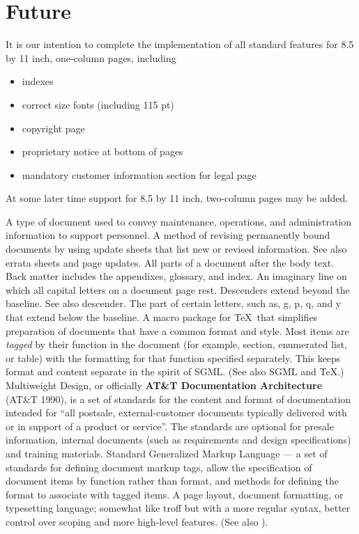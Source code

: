 \section{Future}
It is our intention to complete the implementation of all standard
features for 8.5 by 11 inch, one-column pages, including
\begin{itemize}
  \item indexes
  \item correct size fonts (including 115 pt)
  \item copyright page
  \item proprietary notice at bottom of pages
  \item mandatory customer information section for legal page
\end{itemize}

At some later time support for 8.5 by 11 inch, two-column pages may be
added.  
\begin{theglossary}

A type of document used to convey
maintenance, operations, and administration information to support
personnel.
A method of revising permanently bound
documents by using update sheets that list new or revised information.
See also errata sheets and page updates.
All parts of a document after the body text.
Back matter includes the appendixes, glossary, and index.
An imaginary line on which all capital letters
on a document page rest.  Descenders extend beyond the baseline.  See
also descender.
The part of certain letters, such as, g, p, q,
and y  that extend below the baseline.  
\glossarydef{\LaTeXnine}A macro package for \TeX\ that simplifies
preparation of documents that have a common format and style.  Most
items are {\it tagged} by their function in the document (for example,
section, enumerated list, or table) with the formatting for that
function specified separately.  This keeps format and content separate
in the spirit of SGML.  (See also SGML and \TeX .)
Multiweight Design, or officially {\bf
AT\&T Documentation Architecture} (AT\&T 1990), is a set of standards
for the content and format of documentation intended for ``all
postsale, external-customer documents typically delivered with or in
support of a product or service''.  The standards are optional for
presale information, internal documents (such as requirements and
design specifications) and training materials.
Standard Generalized Markup Language --- a set of
standards for defining document markup tags, allow the specification
of document items by function rather than format, and methods for
defining the format to associate with tagged items.
\glossarydef{\TeX}A page layout, document formatting, or typesetting
language; somewhat like troff but with a more regular syntax, better
control over scoping and more high-level features.  (See also \LaTeXnine ).
\end{theglossary}
